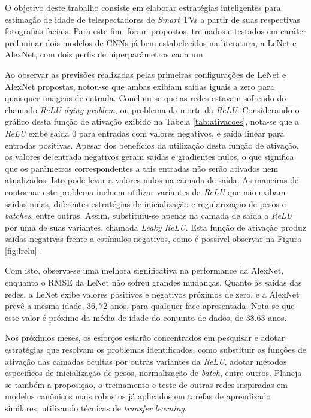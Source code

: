 O objetivo deste trabalho consiste em elaborar estratégias inteligentes para estimação de idade de telespectadores de  \emph{Smart} TVs a partir de suas respectivas fotografias faciais. Para este fim, foram propostos, treinados e testados em caráter preliminar dois modelos de CNNs já bem estabelecidos na literatura, a LeNet e AlexNet, com dois perfis de hiperparâmetros cada um.

Ao observar as previsões realizadas pelas primeiras configurações de LeNet e AlexNet propostas, notou-se que ambas exibiam saídas iguais a zero para quaisquer imagens de entrada. Concluiu-se que as redes estavam sofrendo do chamado \emph{ReLU dying problem}, ou problema da morte da \emph{ReLU}. Considerando o gráfico desta função de ativação exibido na Tabela \ref{tab:ativacoes}, nota-se que a \emph{ReLU} exibe saída $0$ para entradas com valores negativos, e saída linear para entradas positivas.
Apesar dos benefícios da utilização desta função de ativação, os valores de entrada negativos geram saídas e gradientes nulos, o que significa que os parâmetros correspondentes a tais entradas não serão ativados nem atualizados. Isto pode levar a valores nulos na camada de saída. As maneiras de contornar este problema incluem utilizar variantes da \emph{ReLU} que não exibam saídas nulas, diferentes estratégias de inicialização e regularização de pesos e \emph{batches}, entre outras. Assim, substituiu-se apenas na camada de saída a \emph{ReLU} por uma de suas variantes, chamada \emph{Leaky ReLU}. Esta função de ativação produz saídas negativas frente a estímulos negativos, como é possível observar na Figura \ref{fig:lrelu} \cite{djork2015elus, dabal2018elus}.

Com isto, observa-se uma melhora significativa na performance da AlexNet, enquanto o RMSE da LeNet não sofreu grandes mudanças. Quanto às saídas das redes, a LeNet exibe valores positivos e negativos próximos de zero, e a AlexNet prevê a mesma idade, $36,72$ anos, para qualquer face apresentada. Nota-se que este valor é próximo da média de idade do conjunto de dados, de $38.63$ anos.

Nos próximos meses, os esforços estarão concentrados em pesquisar e adotar estratégias que resolvam os problemas identificados, como substituir as funções de ativação das camadas ocultas por outras variantes da \emph{ReLU}, adotar métodos específicos de inicialização de pesos, normalização de \emph{batch}, entre outros. Planeja-se também a proposição, o treinamento e teste de outras redes inspiradas em modelos canônicos mais robustos já aplicados em tarefas de aprendizado similares, utilizando técnicas de \emph{transfer learning}.
